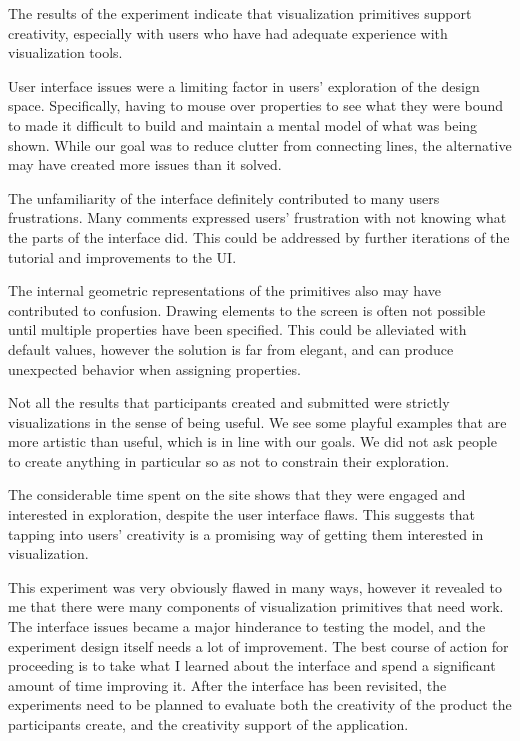 \label{discussion}

The results of the experiment indicate that visualization primitives support creativity, especially with users who have had adequate experience with visualization tools.

User interface issues were a limiting factor in users' exploration of the design space.
Specifically, having to mouse over properties to see what they were bound to made it difficult to build and maintain a mental model of what was being shown.
While our goal was to reduce clutter from connecting lines, the alternative may have created more issues than it solved.

The unfamiliarity of the interface definitely contributed to many users frustrations.
Many comments expressed users' frustration with not knowing what the parts of the interface did.
This could be addressed by further iterations of the tutorial and improvements to the UI.

The internal geometric representations of the primitives also may have contributed to confusion.
Drawing elements to the screen is often not possible until multiple properties have been specified.
This could be alleviated with default values, however the solution is far from elegant, and can produce unexpected behavior when assigning properties.

Not all the results that participants created and submitted were strictly visualizations in the sense of being useful. We see some playful examples that are more artistic than useful, which is in line with our goals. We did not ask people to create anything in particular so as not to constrain their exploration.

The considerable time spent on the site shows that they were engaged and interested in exploration, despite the user interface flaws.
This suggests that tapping into users' creativity is a promising way of getting them interested in visualization.

\label{lessonsLearned}

This experiment was very obviously flawed in many ways, however it revealed to me that there were many components of visualization primitives that need work.
The interface issues became a major hinderance to testing the model, and the experiment design itself needs a lot of improvement.
The best course of action for proceeding is to take what I learned about the interface and spend a significant amount of time improving it.
After the interface has been revisited, the experiments need to be planned to evaluate both the creativity of the product the participants create, and the creativity support of the application.

